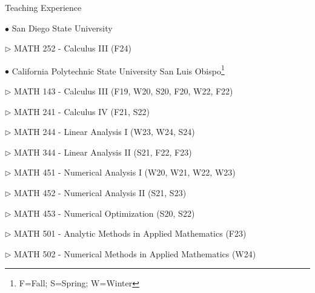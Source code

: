 \documentclass[10pt]{article} %
\newenvironment{outerlist}[1][\enskip\textbullet]%
        {\begin{itemize}[#1]}{\end{itemize}%
         \vspace{-.6\baselineskip}}
\newenvironment{innerlist}[1][\enskip\textbullet]%
        {\begin{compactitem}[#1]}{\end{compactitem}}
\begin{document}
\begin{section}{Teaching Experience}
\begin{outerlist}

\item[$\bullet$] \vskip -7mm
San Diego State University
\begin{innerlist}
\item[$\triangleright$] MATH 252 - Calculus III (F24)
\end{innerlist}

\item[$\bullet$]
California Polytechnic State University San Luis Obispo\footnote{\label{note1}F=Fall; S=Spring; W=Winter}
\begin{innerlist}
\item[$\triangleright$] MATH 143 - Calculus III (F19, W20, S20, F20, W22, F22)
\item[$\triangleright$] MATH 241 - Calculus IV (F21, S22)
\item[$\triangleright$] MATH 244 - Linear Analysis I (W23, W24, S24)
\item[$\triangleright$] MATH 344 - Linear Analysis II (S21, F22, F23)
\item[$\triangleright$] MATH 451 - Numerical Analysis I (W20, W21, W22, W23)
\item[$\triangleright$] MATH 452 - Numerical Analysis II (S21, S23)
\item[$\triangleright$] MATH 453 - Numerical Optimization (S20, S22)
\item[$\triangleright$] MATH 501 - Analytic Methods in Applied Mathematics (F23)
\item[$\triangleright$] MATH 502 - Numerical Methods in Applied Mathematics (W24)
\end{innerlist}


\end{outerlist}
\end{section}
\end{document}
